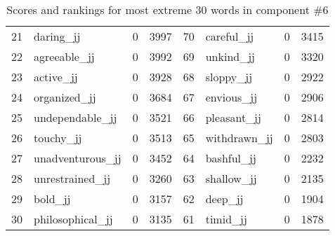 \begin{table}[tbp]
\begin{tabular}{| rlr@{.}l | rlr@{.}l |}
    21 & daring\_jj & 0 & 3997    &    70 & careful\_jj & 0 & 3415 \\
    22 & agreeable\_jj & 0 & 3992    &    69 & unkind\_jj & 0 & 3320 \\
    23 & active\_jj & 0 & 3928    &    68 & sloppy\_jj & 0 & 2922 \\
    24 & organized\_jj & 0 & 3684    &    67 & envious\_jj & 0 & 2906 \\
    25 & undependable\_jj & 0 & 3521    &    66 & pleasant\_jj & 0 & 2814 \\
    26 & touchy\_jj & 0 & 3513    &    65 & withdrawn\_jj & 0 & 2803 \\
    27 & unadventurous\_jj & 0 & 3452    &    64 & bashful\_jj & 0 & 2232 \\
    28 & unrestrained\_jj & 0 & 3260    &    63 & shallow\_jj & 0 & 2135 \\
    29 & bold\_jj & 0 & 3157    &    62 & deep\_jj & 0 & 1904 \\
    30 & philosophical\_jj & 0 & 3135    &    61 & timid\_jj & 0 & 1878 \\
    \hline
    \end{tabular}
    \caption{Scores and rankings for most extreme 30 words in component \#6} 
\end{table}
\clearpage
